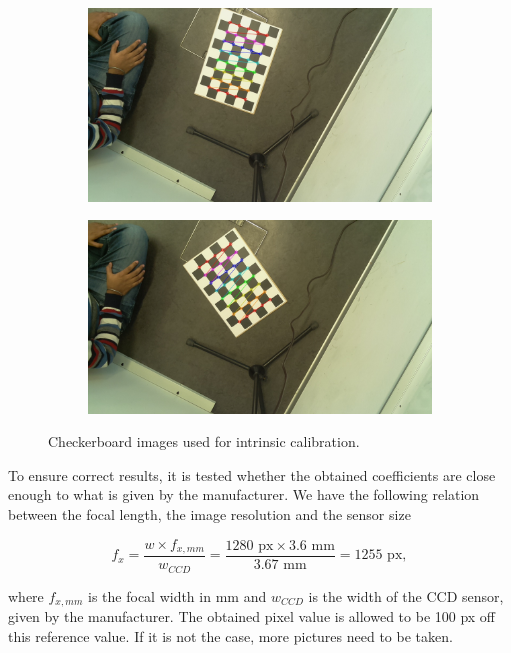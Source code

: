 \begin{figure}[H]
\begin{subfigure}{0.2\linewidth}
    \end{subfigure}
    \begin{subfigure}{0.2\linewidth}
        \includegraphics[width=\linewidth]{files/output145_7.jpg}
    \end{subfigure}
    \begin{subfigure}{0.2\linewidth}
        \includegraphics[width=\linewidth]{files/output145_8.jpg}
    \end{subfigure}
    \caption{Checkerboard images used for intrinsic calibration. }
    \label{fig:checkerboard}
\end{figure}

To ensure correct results, it is tested whether the obtained coefficients are close enough to what is given by the manufacturer. 
We have the following relation between the focal length, the image resolution and the sensor size

\begin{equation}
    f_x = \frac{w \times f_{x,mm}}{w_{CCD}} = \frac{1280\text{ px} \times 3.6\text{ mm}}{3.67\text{ mm}} = 1255 \text{ px},
\end{equation}

where $f_{x,mm}$ is the focal width in mm and $w_{CCD}$ is the width of the CCD sensor, given by the manufacturer.
The obtained pixel value is allowed to be 100 px off this reference value. If it is not the case, more pictures need to be taken.
